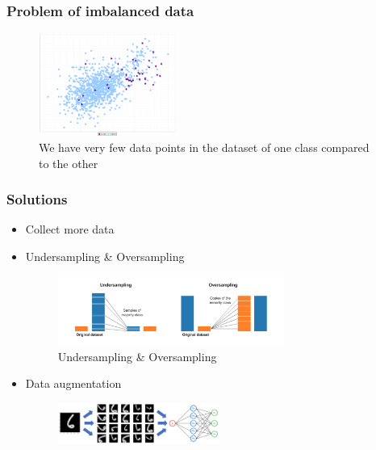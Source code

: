 \documentclass{article}
\begin{document}
\subsubsection{Problem of imbalanced data}


\begin{figure}[H]
    \centering
    \includegraphics[width=0.4\textwidth]{img/imbalanced-data-problem.png}
    \caption{We have very few data points in the dataset of one class compared to the other}
\end{figure}

\subsubsection{Solutions}

\begin{itemize}
    \item Collect more data
    \item Undersampling \& Oversampling
    \begin{figure}[H]
        \centering
        \includegraphics[width=0.7\textwidth]{img/imbalanced-data-sampling.png}
        \caption{Undersampling \& Oversampling}
    \end{figure}
    \item Data augmentation
    \begin{figure}[H]
        \centering
        \includegraphics[width=0.5\textwidth]{img/data-augmentation.png}
    \end{figure}
\end{itemize}
\end{document}
